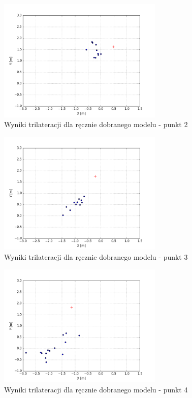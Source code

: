 \begin{figure}[H]
\centering
\includegraphics[width=0.7\textwidth]{img/trilat-map3-2.png}
\caption{Wyniki trilateracji dla ręcznie dobranego modelu - punkt 2}
\end{figure}
\begin{figure}[H]
\centering
\includegraphics[width=0.7\textwidth]{img/trilat-map3-3.png}
\caption{Wyniki trilateracji dla ręcznie dobranego modelu - punkt 3}
\end{figure}
\begin{figure}[H]
\centering
\includegraphics[width=0.7\textwidth]{img/trilat-map3-4.png}
\caption{Wyniki trilateracji dla ręcznie dobranego modelu - punkt 4}
\end{figure}
